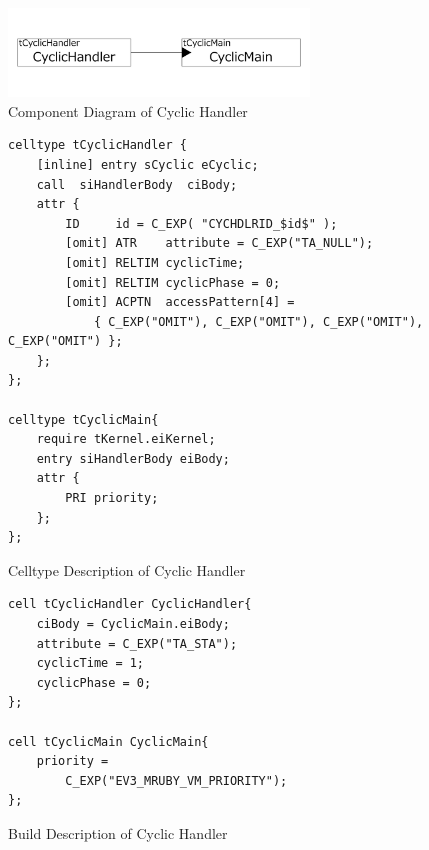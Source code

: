 \documentclass[conference,compsoc]{IEEEtran}
\providecommand{\DIFdelbegin}{} %
\providecommand{\DIFdelend}{} %
\begin{document}
\begin{figure}[t]
    \centering
    \includegraphics[width=8cm,clip]{figure/cyclic_handler.pdf}
    \caption{Component Diagram of Cyclic Handler}
    \label{fig:cyclic_handler}
\end{figure}
\begin{figure}[t]
    \centering
    \begin{lstlisting}
celltype tCyclicHandler {
    [inline] entry sCyclic eCyclic;
    call  siHandlerBody  ciBody;
    attr {
    	ID     id = C_EXP( "CYCHDLRID_$id$" );
    	[omit] ATR    attribute = C_EXP("TA_NULL");
    	[omit] RELTIM cyclicTime;
    	[omit] RELTIM cyclicPhase = 0;
        [omit] ACPTN  accessPattern[4] =
            { C_EXP("OMIT"), C_EXP("OMIT"), C_EXP("OMIT"), C_EXP("OMIT") };
    };
};

celltype tCyclicMain{
    require tKernel.eiKernel;
    entry siHandlerBody eiBody;
    attr {
        PRI priority;
    };
};
    \end{lstlisting}
    \caption{Celltype Description of Cyclic Handler}
    \label{celltype_cyclic_handler}
\end{figure}
\DIFdelbegin %

\DIFdelend \begin{figure}[t]
    \centering
    \begin{lstlisting}
cell tCyclicHandler CyclicHandler{
    ciBody = CyclicMain.eiBody;
    attribute = C_EXP("TA_STA");
    cyclicTime = 1;
    cyclicPhase = 0;
};

cell tCyclicMain CyclicMain{
    priority =
        C_EXP("EV3_MRUBY_VM_PRIORITY");
};
   \end{lstlisting}
    \caption{Build Description of Cyclic Handler}
    \label{build_cyclic_handler}
\end{figure}
\end{document}
